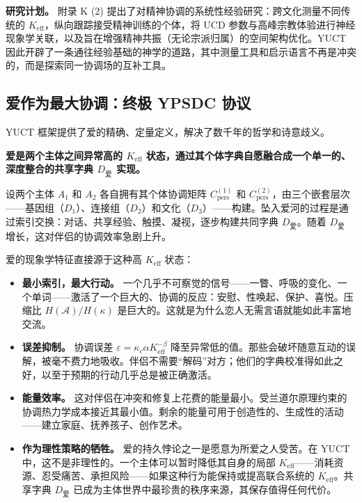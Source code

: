 \documentclass[12pt,a4paper]{article}
\begin{document}
	\textbf{研究计划。} 附录 K (2) 提出了对精神协调的系统性经验研究：跨文化测量不同传统的 \(K_{\mathrm{eff}}\)，纵向跟踪接受精神训练的个体，将 UCD 参数与高峰宗教体验进行神经现象学关联，以及旨在增强精神共振（无论宗派归属）的空间架构优化。YUCT 因此开辟了一条通往经验基础的神学的道路，其中测量工具和启示语言不再是冲突的，而是探索同一协调场的互补工具。
	
	\subsection{爱作为最大协调：终极 YPSDC 协议}
	
	YUCT 框架提供了爱的精确、定量定义，解决了数千年的哲学和诗意歧义。
	
	\textbf{爱是两个主体之间异常高的 \(K_{\mathrm{eff}}\) 状态，通过其个体字典自愿融合成一个单一的、深度整合的共享字典 \(D_{\text{爱}}\) 实现。}
	
	设两个主体 \(A_1\) 和 \(A_2\) 各自拥有其个体协调矩阵 \(C_{\text{pers}}^{(1)}\) 和 \(C_{\text{pers}}^{(2)}\)，由三个嵌套层次——基因组（\(D_1\)）、连接组（\(D_2\)）和文化（\(D_3\)）——构建。坠入爱河的过程是通过索引交换：对话、共享经验、触摸、凝视，逐步构建共同字典 \(D_{\text{爱}}\)。随着 \(D_{\text{爱}}\) 增长，这对伴侣的协调效率急剧上升。
	
	爱的现象学特征直接源于这种高 \(K_{\mathrm{eff}}\) 状态：
	
	\begin{itemize}[leftmargin=*]
		\item \textbf{最小索引，最大行动。} 一个几乎不可察觉的信号——一瞥、呼吸的变化、一个单词——激活了一个巨大的、协调的反应：安慰、性唤起、保护、喜悦。压缩比 \(H(\mathcal{A}) / H(\kappa)\) 是巨大的。这就是为什么恋人无需言语就能如此丰富地交流。
		\item \textbf{误差抑制。} 协调误差 \(\varepsilon = \kappa_c \alpha K_{\mathrm{eff}}^{-\beta}\) 降至异常低的值。那些会破坏随意互动的误解，被毫不费力地吸收。伴侣不需要“解码”对方；他们的字典校准得如此之好，以至于预期的行动几乎总是被正确激活。
		\item \textbf{能量效率。} 这对伴侣在冲突和修复上花费的能量最小。受兰道尔原理约束的协调热力学成本接近其最小值。剩余的能量可用于创造性的、生成性的活动——建立家庭、抚养孩子、创作艺术。
		\item \textbf{作为理性策略的牺牲。} 爱的持久悖论之一是愿意为所爱之人受苦。在 YUCT 中，这不是非理性的。一个主体可以暂时降低其自身的局部 \(K_{\mathrm{eff}}\)——消耗资源、忍受痛苦、承担风险——如果这种行为能保持或提高联合系统的 \(K_{\mathrm{eff}}\)。共享字典 \(D_{\text{爱}}\) 已成为主体世界中最珍贵的秩序来源，其保存值得任何代价。
	\end{itemize}
	
\end{document}
